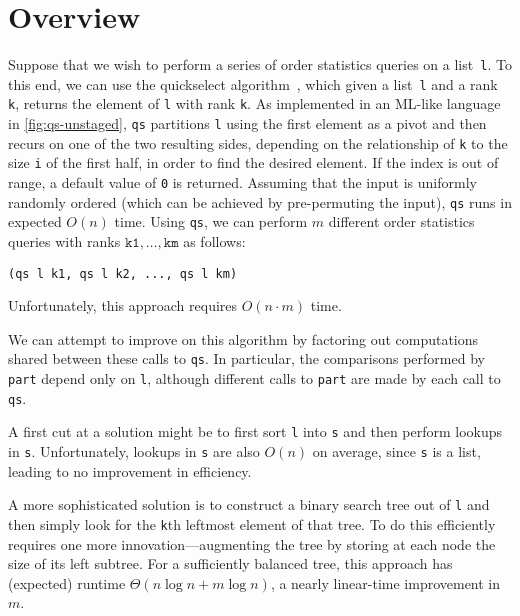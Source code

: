 
\section{Overview}
\label{sec:overview}

\begin{abstrsyn}

Suppose that we wish to perform a series of order statistics queries
on a list~\texttt{l}. To this end, we can use the quickselect
algorithm~\cite{Hoare:1961}, which given a list~\texttt{l} and a rank
\texttt{k}, returns the element of \texttt{l} with rank \texttt{k}.
As implemented in an ML-like language in \ref{fig:qs-unstaged},
\texttt{qs} partitions \texttt{l} using the first element as
a pivot and then recurs on one of the two resulting sides, depending on
the relationship of \texttt{k} to the size \texttt{i} of the first half, in
order to find the desired element.  
If the index is out of range, a default value of \texttt{0} is returned.
Assuming that the input is uniformly
randomly ordered (which can be achieved by pre-permuting the input), \texttt{qs}
runs in expected $O(n)$ time.
%
Using \texttt{qs}, we can perform $m$ different order statistics queries with
ranks $\mathtt{k1},\dots,\mathtt{km}$ as follows:
%
\begin{lstlisting}
(qs l k1, qs l k2, ..., qs l km)
\end{lstlisting}
%
Unfortunately, this approach requires $O(n \cdot m)$ time.

We can attempt to improve on this algorithm by factoring out computations shared
between these calls to \texttt{qs}. In particular, the comparisons performed by
\texttt{part} depend only on \texttt{l}, although different calls to
\texttt{part} are made by each call to \texttt{qs}.

A first cut at a solution might be to first sort \texttt{l} into
\texttt{s} and then perform lookups in \texttt{s}.
Unfortunately, lookups in \texttt{s} are also $O(n)$ on average, since
\texttt{s} is a list, leading to no improvement in efficiency.  

A more sophisticated solution is to construct a binary search
tree out of \texttt{l} and then simply look for the \texttt{k}th
leftmost element of that tree. To do this efficiently requires one more
innovation---augmenting the tree by storing at each node the size of its left
subtree. For a sufficiently balanced tree, this approach has 
(expected) runtime $\Theta(n\log{n} + m\log{n})$, 
a nearly linear-time improvement in $m$.


\end{abstrsyn}
